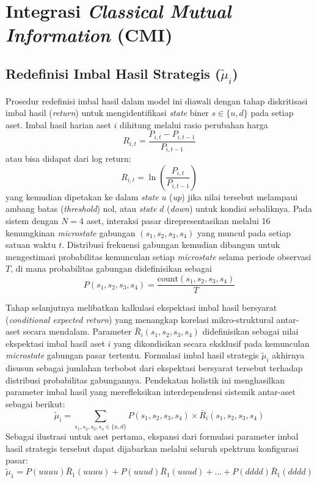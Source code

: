 \section{Integrasi \textit{Classical Mutual Information} (CMI)}

\subsection{Redefinisi Imbal Hasil Strategis ($\tilde{\mu}_i$)}
Prosedur redefinisi imbal hasil dalam model ini diawali dengan tahap diskritisasi imbal hasil (\textit{return}) untuk mengidentifikasi \textit{state} biner $s \in \{u, d\}$ pada setiap aset. Imbal hasil harian aset $i$ dihitung melalui rasio perubahan harga 
\begin{equation}
    R_{i,t} = \frac{P_{i,t} - P_{i,t-1}}{P_{i,t-1}}
\end{equation}
atau bisa didapat dari log return:
\begin{equation}
    R_{i,t} = \ln \left( \frac{P_{i,t}}{P_{i,t-1}} \right)
\end{equation}
yang kemudian dipetakan ke dalam \textit{state} $u$ (\textit{up}) jika nilai tersebut melampaui ambang batas (\textit{threshold}) nol, atau \textit{state} $d$ (\textit{down}) untuk kondisi sebaliknya. Pada sistem dengan $N=4$ aset, interaksi pasar direpresentasikan melalui 16 kemungkinan \textit{microstate} gabungan $(s_1, s_2, s_3, s_4)$ yang muncul pada setiap satuan waktu $t$. Distribusi frekuensi gabungan kemudian dibangun untuk mengestimasi probabilitas kemunculan setiap \textit{microstate} selama periode observasi $T$, di mana probabilitas gabungan didefinisikan sebagai 
\begin{equation}
    P(s_1, s_2, s_3, s_4) = \frac{\text{count}(s_1, s_2, s_3, s_4)}{T}
\end{equation}

Tahap selanjutnya melibatkan kalkulasi ekspektasi imbal hasil bersyarat (\textit{conditional expected return}) yang menangkap korelasi mikro-struktural antar-aset secara mendalam. Parameter $\bar{R}_i(s_1, s_2, s_3, s_4)$ didefinisikan sebagai nilai ekspektasi imbal hasil aset $i$ yang dikondisikan secara eksklusif pada kemunculan \textit{microstate} gabungan pasar tertentu. Formulasi imbal hasil strategis $\tilde{\mu}_i$ akhirnya disusun sebagai jumlahan terbobot dari ekspektasi bersyarat tersebut terhadap distribusi probabilitas gabungannya. Pendekatan holistik ini menghasilkan parameter imbal hasil yang merefleksikan interdependensi sistemik antar-aset sebagai berikut:
\begin{equation}
    \tilde{\mu}_i = \sum_{s_1, s_2, s_3, s_4 \in \{u,d\}} P(s_1, s_2, s_3, s_4) \times \bar{R}_i(s_1, s_2, s_3, s_4)
\end{equation}
Sebagai ilustrasi untuk aset pertama, ekspansi dari formulasi parameter imbal hasil strategis tersebut dapat dijabarkan melalui seluruh spektrum konfigurasi pasar:
\begin{equation}
    \tilde{\mu}_1 = P(uuuu)\bar{R}_1(uuuu) + P(uuud)\bar{R}_1(uuud) + \dots + P(dddd)\bar{R}_1(dddd)
\end{equation}

